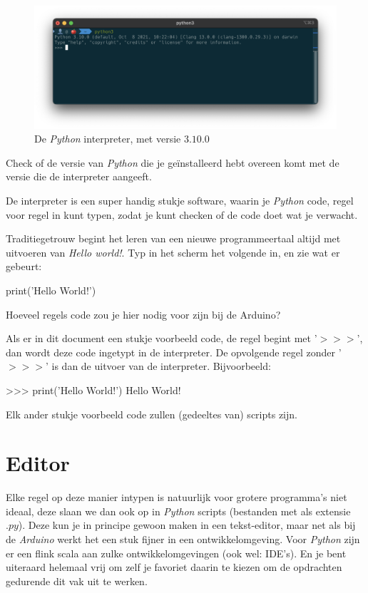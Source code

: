 \begin{figure}[h!]
\centering\includegraphics[scale=0.42]{Pictures/chapter04/python_shell.png}
\caption{De \textit{Python} interpreter, met versie $3.10.0$}
\label{fig:interpreter} %
\end{figure}

\begin{exercise}
Check of de versie van \textit{Python} die je geïnstalleerd hebt overeen komt met de versie die de interpreter aangeeft.
\end{exercise}

De interpreter is een super handig stukje software, waarin je \textit{Python} code, regel voor regel in kunt typen, zodat je kunt checken of de code doet wat je verwacht. 
\begin{exercise}
Traditiegetrouw begint het leren van een nieuwe programmeertaal altijd met uitvoeren van \textit{Hello world!}. Typ in het scherm het volgende in, en zie wat er gebeurt:
\begin{python}[numbers=none]
print('Hello World!')
\end{python}
Hoeveel regels code zou je hier nodig voor zijn bij de Arduino?
\end{exercise}

\begin{remark}
Als er in dit document een stukje voorbeeld code, de regel begint met '$>>>$', dan wordt deze code ingetypt in de interpreter. De opvolgende regel zonder '$>>>$' is dan de uitvoer van de interpreter. Bijvoorbeeld:
\begin{python}
>>> print('Hello World!')
Hello World!
\end{python}
Elk ander stukje voorbeeld code zullen (gedeeltes van) scripts zijn. 
\end{remark}

\section{Editor}
Elke regel op deze manier intypen is natuurlijk voor grotere programma's niet ideaal, deze slaan we dan ook op in \textit{Python} scripts (bestanden met als extensie $.py$). Deze kun je in principe gewoon maken in een tekst-editor, maar net als bij de \textit{Arduino} werkt het een stuk fijner in een ontwikkelomgeving. Voor \textit{Python} zijn er een flink scala aan zulke ontwikkelomgevingen (ook wel: IDE's). En je bent uiteraard helemaal vrij om zelf je favoriet daarin te kiezen om de opdrachten gedurende dit vak uit te werken.

